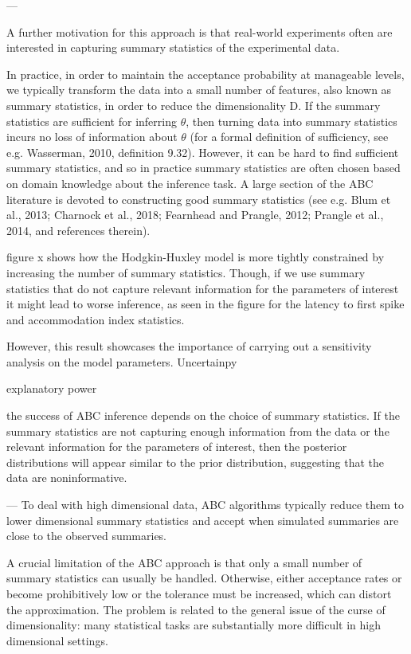 ---

A further motivation for this approach is that real-world experiments often are interested in capturing summary statistics of the experimental data. 

In practice, in order to maintain the acceptance probability at manageable levels, we typically transform the data into a small number of features, also known as summary statistics, in order to reduce the dimensionality D. If the summary statistics are sufficient for inferring $\theta$, then turning data into summary statistics incurs no loss of information about $\theta$ (for a formal definition of sufficiency, see e.g. Wasserman, 2010, definition 9.32). However, it can be hard to find sufficient summary statistics, and so in practice summary statistics are often chosen based on domain knowledge about the inference task. A large section of the ABC literature is devoted to constructing good summary statistics (see e.g. Blum et al., 2013; Charnock et al., 2018; Fearnhead and Prangle, 2012; Prangle et al., 2014, and references therein).


figure x shows how the Hodgkin-Huxley model is more tightly constrained by increasing the number of summary statistics. Though, if we use summary statistics that do not capture relevant information for the parameters of interest it might lead to worse inference, as seen in the figure for the latency to first spike and accommodation index statistics.  

However, this result showcases the importance of carrying out a sensitivity analysis on the model parameters. Uncertainpy

explanatory power

the success of ABC inference depends on the choice of summary statistics. If the summary statistics are not capturing enough information from the data or the relevant information for the parameters of interest, then the posterior distributions will appear similar to the prior distribution, suggesting that the data are noninformative. 

--- 
To deal with high dimensional data, ABC algorithms typically reduce them to lower dimensional summary statistics and accept when simulated summaries are close to the observed summaries. 

A crucial limitation of the ABC approach is that only a small number of summary statistics can usually be handled. Otherwise, either acceptance rates or become prohibitively low or the tolerance must be increased, which can distort the approximation. The problem is related to the general issue of the curse of dimensionality: many statistical tasks are substantially more difficult in high dimensional settings. 


